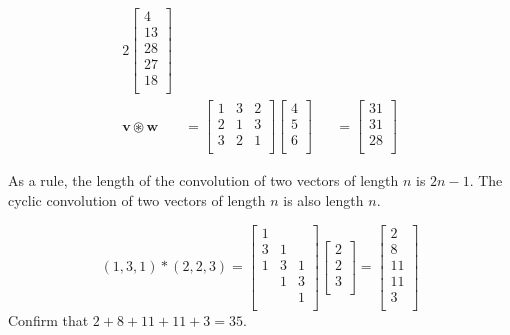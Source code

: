 \documentclass[a4paper]{article}
\begin{document}
\begin{enumerate}[label=(\alph*)]
\begin{alignat*}{2}
\begin{bmatrix}
				4\\
				13\\
				28\\
				27\\
				18\\
			\end{bmatrix} \\
			\pmb{v \circledast w} & = \begin{bmatrix}
				1 & 3 & 2\\
				2 & 1 & 3\\
				3 & 2 & 1\\
			\end{bmatrix}
			\begin{bmatrix}
				4\\
				5\\
				6\\
			\end{bmatrix} && = 
			\begin{bmatrix}
				31\\
				31\\
				28\\
			\end{bmatrix}
	\end{alignat*}
\end{enumerate}
As a rule, the length of the convolution of two vectors of length \( n \) is \( 2n - 1 \). The cyclic convolution of two vectors of length \( n \) is also length \( n \).

\vspace{12pt}

\[
	\!\left( 1,3,1 \right) * \!\left( 2,2,3 \right) = \begin{bmatrix}
		1 &  & \\
		3 & 1 & \\
		1 & 3 & 1\\
		 & 1 & 3\\
		 &  & 1\\
	\end{bmatrix}
	\begin{bmatrix}
		2\\
		2\\
		3\\
	\end{bmatrix} = 
	\begin{bmatrix}
		2\\
		8\\
		11\\
		11\\
		3\\
	\end{bmatrix}
\]
Confirm that \( 2 + 8 + 11 + 11 + 3 = 35 \).
\end{document}
